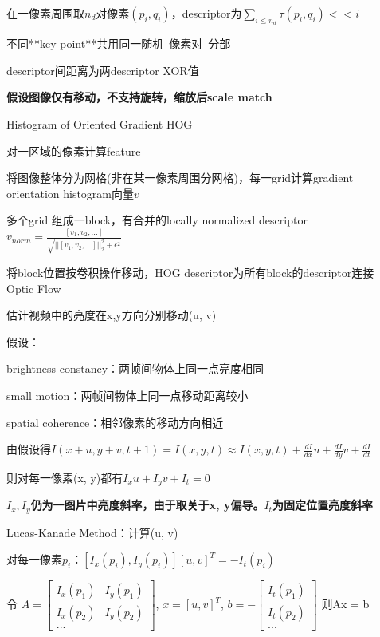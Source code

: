 \documentclass[UTF8]{ctexart}
\begin{document}
  \quad 在一像素周围取$n_d$对像素$(p_i, q_i)$，descriptor为$\sum_{i \leq n_d} \tau(p_i, q_i) << i$

  \quad \quad 不同**key point**共用同一随机\ 像素对\ 分部

  \quad descriptor间距离为两descriptor XOR值

  \quad \textbf{假设图像仅有移动，不支持旋转，缩放后scale match}
  
  Histogram of Oriented Gradient HOG 

  \quad 对一区域的像素计算feature

  \quad 将图像整体分为网格(非在某一像素周围分网格)，每一grid计算gradient orientation histogram向量$v$

  \quad 多个grid 组成一block，有合并的locally normalized descriptor$v_{norm} = \frac{[v_1, v_2, ...]}{\sqrt{||[v_1, v_2, ...]||_2^2 + \epsilon^2}}$

  \quad 将block位置按卷积操作移动，HOG descriptor为所有block的descriptor连接\\
Optic Flow

  估计视频中的亮度在x,y方向分别移动(u, v)

  假设：

  \quad brightness constancy：两帧间物体上同一点亮度相同

  \quad small motion：两帧间物体上同一点移动距离较小

  \quad spatial coherence：相邻像素的移动方向相近
  
  由假设得$I(x + u, y + v, t + 1) = I(x, y, t) \approx I(x, y, t) + \frac{dI}{dx}u + \frac{dI}{dy}v + \frac{dI}{dt}$

  \quad 则对每一像素(x, y)都有$I_xu + I_yv + I_t = 0$

  \quad \textbf{$I_x, I_y$仍为一图片中亮度斜率，由于取关于x, y偏导。$I_t$为固定位置亮度斜率}

  Lucas-Kanade Method：计算(u, v)

  \quad 对每一像素$p_i$：$[I_x(p_i), I_y(p_i)][u, v]^T = -I_t(p_i)$

  \quad 令
    $A = 
    \begin{bmatrix}
      I_x(p_1) & I_y(p_1) \\ 
      I_x(p_2) & I_y(p_2) \\ 
      ...
      \end{bmatrix}$, 
    $x = [u, v]^T$,
    $b = -
    \begin{bmatrix}
      I_t(p_1) \\ 
      I_t(p_2) \\ 
      ...
      \end{bmatrix}$
    则Ax = b
\end{document}
